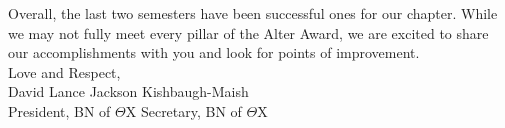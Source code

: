 Overall, the last two semesters have been successful ones for our chapter. While we may not fully meet every pillar of the Alter Award, we are excited to share our accomplishments with you and look for points of improvement. \\

Love and Respect, \\
David Lance \hfill Jackson Kishbaugh-Maish \\ 
President, BN of $\Theta$X \hfill Secretary, BN of $\Theta$X \\

